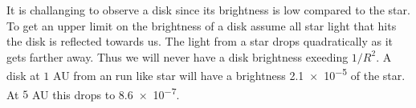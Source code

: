 It is challanging to observe a disk since its brightness is low compared to the star. To get an upper limit on the brightness of a disk assume all star light that hits the disk is reflected towards us. The light from a star drops quadratically as it gets farther away. Thus we will never have a disk brightness exeeding $1/R^2$. A disk at $1$ AU from an run like star will have a brightness \num{2.1e-5} of the star. At $5$ AU this drops to \num{8.6e-7}. 


